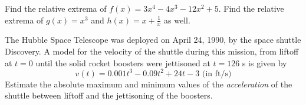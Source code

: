 \documentclass[12pt, a4paper]{article}
\begin{document}
\vspace{-2.5in}
\begin{ex}
  Find the relative extrema of \(f(x) = 3x^4 - 4x^3 - 12x^2 +
  5\). Find the relative extrema of \(g(x) = x^3\) and \(h(x) = x +
  \frac{1}{x}\) as well.
\end{ex}
\begin{ex}
  The Hubble Space Telescope was deployed on April 24, 1990, by the
  space shuttle Discovery. A model for the velocity of the
  shuttle during this mission, from liftoff at \(t=0\) until the solid
  rocket boosters were jettisoned at \(t = 126\) s is given by \[
    v(t) = 0.001 t^3 - 0.09t^2 + 24t - 3 \text{ (in ft/s)}
  \]
  Estimate the absolute maximum and minimum values of the
  \emph{acceleration} of the shuttle between liftoff and the
  jettisoning of the boosters.
\end{ex}
\end{document}
